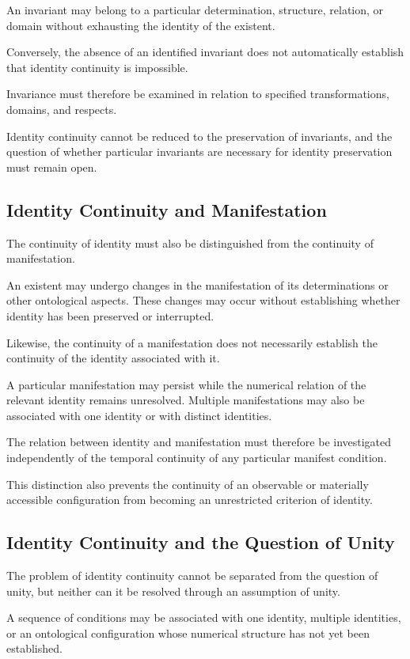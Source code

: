 An invariant may belong to a particular
determination, structure, relation, or domain
without exhausting the identity of the existent.

Conversely, the absence of an identified
invariant does not automatically establish
that identity continuity is impossible.

Invariance must therefore be examined in
relation to specified transformations,
domains, and respects.

Identity continuity cannot be reduced to
the preservation of invariants, and the
question of whether particular invariants
are necessary for identity preservation
must remain open.

\subsection{Identity Continuity and Manifestation}

The continuity of identity must also be
distinguished from the continuity of manifestation.

An existent may undergo changes in the
manifestation of its determinations or
other ontological aspects. These changes
may occur without establishing whether
identity has been preserved or interrupted.

Likewise, the continuity of a manifestation
does not necessarily establish the continuity
of the identity associated with it.

A particular manifestation may persist
while the numerical relation of the relevant
identity remains unresolved. Multiple
manifestations may also be associated with
one identity or with distinct identities.

The relation between identity and manifestation
must therefore be investigated independently
of the temporal continuity of any particular
manifest condition.

This distinction also prevents the continuity
of an observable or materially accessible
configuration from becoming an unrestricted
criterion of identity.

\subsection{Identity Continuity and the Question of Unity}

The problem of identity continuity cannot
be separated from the question of unity,
but neither can it be resolved through
an assumption of unity.

A sequence of conditions may be associated
with one identity, multiple identities, or
an ontological configuration whose numerical
structure has not yet been established.

